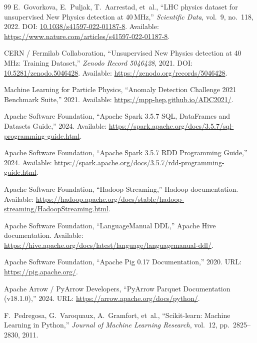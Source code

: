 \documentclass[11pt,a4paper]{article}
\begin{document}
\begin{thebibliography}{99}
E.~Govorkova, E.~Puljak, T.~Aarrestad, et~al., ``LHC physics dataset for unsupervised New Physics detection at 40\,MHz,'' \emph{Scientific Data}, vol.~9, no.~118, 2022. DOI: \href{https://doi.org/10.1038/s41597-022-01187-8}{10.1038/s41597-022-01187-8}. Available: \url{https://www.nature.com/articles/s41597-022-01187-8}.

CERN / Fermilab Collaboration, ``Unsupervised New Physics detection at 40\,MHz: Training Dataset,'' \emph{Zenodo Record 5046428}, 2021. DOI: \href{https://doi.org/10.5281/zenodo.5046428}{10.5281/zenodo.5046428}. Available: \url{https://zenodo.org/records/5046428}.

Machine Learning for Particle Physics, ``Anomaly Detection Challenge 2021 Benchmark Suite,'' 2021. Available: \url{https://mpp-hep.github.io/ADC2021/}.

Apache Software Foundation, ``Apache Spark 3.5.7 SQL, DataFrames and Datasets Guide,'' 2024. Available: \url{https://spark.apache.org/docs/3.5.7/sql-programming-guide.html}.

Apache Software Foundation, ``Apache Spark 3.5.7 RDD Programming Guide,'' 2024. Available: \url{https://spark.apache.org/docs/3.5.7/rdd-programming-guide.html}.

Apache Software Foundation, ``Hadoop Streaming,'' Hadoop documentation. Available: \url{https://hadoop.apache.org/docs/stable/hadoop-streaming/HadoopStreaming.html}.

Apache Software Foundation, ``LanguageManual DDL,'' Apache Hive documentation. Available: \url{https://hive.apache.org/docs/latest/language/languagemanual-ddl/}.

Apache Software Foundation, ``Apache Pig 0.17 Documentation,'' 2020. URL: \href{https://pig.apache.org/docs/r0.17.0/}{https://pig.apache.org/}.

Apache Arrow / PyArrow Developers, ``PyArrow Parquet Documentation (v18.1.0),'' 2024. URL: \href{https://arrow.apache.org/docs/python/parquet.html}{https://arrow.apache.org/docs/python/}.

F.~Pedregosa, G.~Varoquaux, A.~Gramfort, et~al., ``Scikit-learn: Machine Learning in Python,'' \emph{Journal of Machine Learning Research}, vol.~12, pp.~2825--2830, 2011.
\end{thebibliography}
\end{document}
